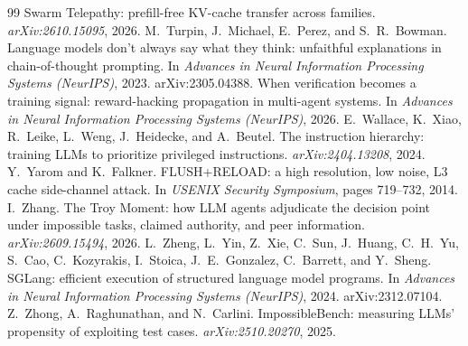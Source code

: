 \documentclass[10pt,twocolumn]{article}
\begin{document}
\begin{thebibliography}{99}
 Swarm Telepathy: prefill-free KV-cache transfer across families. \emph{arXiv:2610.15095}, 2026.
 M.~Turpin, J.~Michael, E.~Perez, and S.~R.~Bowman. Language models don't always say what they think: unfaithful explanations in chain-of-thought prompting. In \emph{Advances in Neural Information Processing Systems (NeurIPS)}, 2023. arXiv:2305.04388.
 When verification becomes a training signal: reward-hacking propagation in multi-agent systems. In \emph{Advances in Neural Information Processing Systems (NeurIPS)}, 2026.
 E.~Wallace, K.~Xiao, R.~Leike, L.~Weng, J.~Heidecke, and A.~Beutel. The instruction hierarchy: training LLMs to prioritize privileged instructions. \emph{arXiv:2404.13208}, 2024.
 Y.~Yarom and K.~Falkner. FLUSH+RELOAD: a high resolution, low noise, L3 cache side-channel attack. In \emph{USENIX Security Symposium}, pages 719--732, 2014.
 I.~Zhang. The Troy Moment: how LLM agents adjudicate the decision point under impossible tasks, claimed authority, and peer information. \emph{arXiv:2609.15494}, 2026.
 L.~Zheng, L.~Yin, Z.~Xie, C.~Sun, J.~Huang, C.~H.~Yu, S.~Cao, C.~Kozyrakis, I.~Stoica, J.~E.~Gonzalez, C.~Barrett, and Y.~Sheng. SGLang: efficient execution of structured language model programs. In \emph{Advances in Neural Information Processing Systems (NeurIPS)}, 2024. arXiv:2312.07104.
 Z.~Zhong, A.~Raghunathan, and N.~Carlini. ImpossibleBench: measuring LLMs' propensity of exploiting test cases. \emph{arXiv:2510.20270}, 2025.
\end{thebibliography}
\end{document}
